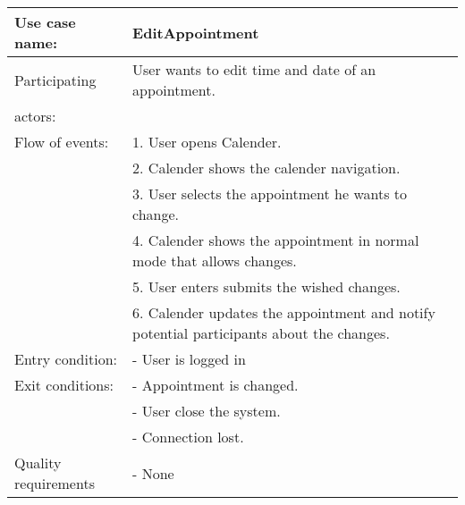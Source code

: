 {\tabulinesep=1.2mm
\begin{tabu}{ | p{3cm} | p{13cm} |}
    \hline
    Use case name: 			& 		EditAppointment\\ \hline
    Participating  			& 		User wants to edit time and date of an appointment. \\
    actors:					& 		\\ \hline
    Flow of events: 		& 		1. User opens Calender. \\
							&		2. Calender shows the calender navigation.\\
							&		3. User selects the appointment he wants to change.\\
							&		4. Calender shows the appointment in normal mode that allows changes.\\
							&		5. User enters submits the wished changes.\\
							&		6. Calender updates the appointment and notify potential participants about the changes.\\ \hline
    Entry condition: 		& 		- User is logged in  \\ \hline
	Exit conditions: 		&		- Appointment is changed.\\
							&		- User close the system.\\
							&		- Connection lost.\\\hline
	Quality requirements	&	 	- None \\\hline
\end{tabu}
}